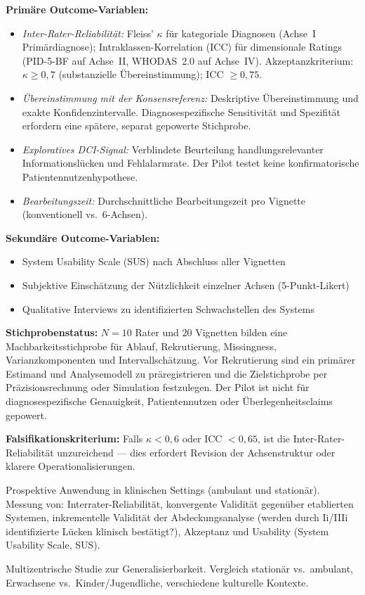 \documentclass[11pt,a4paper]{article}
\begin{document}
\begin{description}[style=nextline, leftmargin=1.5cm, font=\bfseries]
\textbf{Prim\"are Outcome-Variablen:}
\begin{itemize}[leftmargin=*, noitemsep]
    \item \textit{Inter-Rater-Reliabilit\"at:} Fleiss' $\kappa$ f\"ur kategoriale Diagnosen (Achse~I Prim\"ardiagnose); Intraklassen-Korrelation (ICC) f\"ur dimensionale Ratings (PID-5-BF auf Achse~II, WHODAS~2.0 auf Achse~IV). Akzeptanzkriterium: $\kappa \geq 0{,}7$ (substanzielle \"Ubereinstimmung); ICC $\geq 0{,}75$.
    \item \textit{\"Ubereinstimmung mit der Konsensreferenz:} Deskriptive \"Ubereinstimmung und exakte Konfidenzintervalle. Diagnosespezifische Sensitivit\"at und Spezifit\"at erfordern eine sp\"atere, separat gepowerte Stichprobe.
    \item \textit{Exploratives DCI-Signal:} Verblindete Beurteilung handlungsrelevanter Informationsl\"ucken und Fehlalarmrate. Der Pilot testet keine konfirmatorische Patientennutzenhypothese.
    \item \textit{Bearbeitungszeit:} Durchschnittliche Bearbeitungszeit pro Vignette (konventionell vs.\ 6-Achsen).
\end{itemize}

\textbf{Sekund\"are Outcome-Variablen:}
\begin{itemize}[leftmargin=*, noitemsep]
    \item System Usability Scale (SUS) nach Abschluss aller Vignetten
    \item Subjektive Einsch\"atzung der N\"utzlichkeit einzelner Achsen (5-Punkt-Likert)
    \item Qualitative Interviews zu identifizierten Schwachstellen des Systems
\end{itemize}

\textbf{Stichprobenstatus:} $N=10$ Rater und 20 Vignetten bilden eine Machbarkeitsstichprobe f\"ur Ablauf, Rekrutierung, Missingness, Varianzkomponenten und Intervallsch\"atzung. Vor Rekrutierung sind ein prim\"arer Estimand und Analysemodell zu pr\"aregistrieren und die Zielstichprobe per Pr\"azisionsrechnung oder Simulation festzulegen. Der Pilot ist nicht f\"ur diagnosespezifische Genauigkeit, Patientennutzen oder \"Uberlegenheitsclaims gepowert.

\textbf{Falsifikationskriterium:} Falls $\kappa < 0{,}6$ oder ICC $< 0{,}65$, ist die Inter-Rater-Reliabilit\"at unzureichend --- dies erfordert Revision der Achsenstruktur oder klarere Operationalisierungen.

\item[Phase~3: Klinische Felderprobung (N=200+)] Prospektive Anwendung in klinischen Settings (ambulant und station\"ar). Messung von: Interrater-Reliabilit\"at, konvergente Validit\"at gegen\"uber etablierten Systemen, inkrementelle Validit\"at der Abdeckungsanalyse (werden durch Ii/IIIi identifizierte L\"ucken klinisch best\"atigt?), Akzeptanz und Usability (System Usability Scale, SUS).
\item[Phase~4: Multi-Site-Trial] Multizentrische Studie zur Generalisierbarkeit. Vergleich station\"ar vs.\ ambulant, Erwachsene vs.\ Kinder/Jugendliche, verschiedene kulturelle Kontexte.
\end{description}
\end{document}
